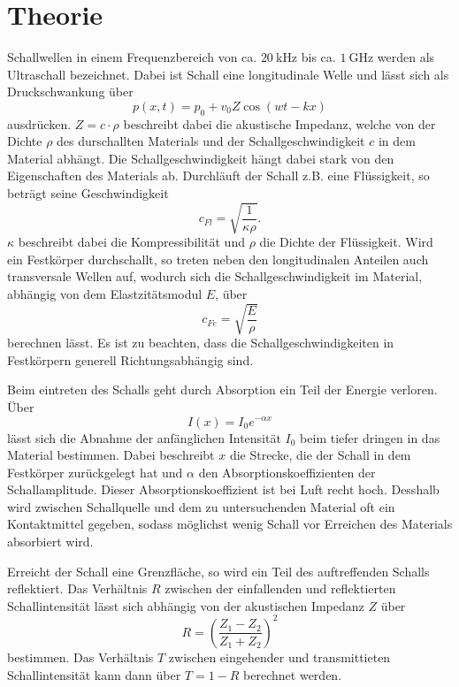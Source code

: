 \section{Theorie}
\label{sec:Theorie}
Schallwellen in einem Frequenzbereich von ca. $\SI{20}{\kilo\hertz}$ bis ca. $\SI{1}{\giga\hertz}$ werden als Ultraschall bezeichnet. Dabei ist Schall eine longitudinale Welle und lässt sich als Druckschwankung über
\begin{equation}
 p(x,t)=p_0+v_0Z\cos(wt-kx)
\end{equation}
ausdrücken. $Z=c\cdot \rho$ beschreibt dabei die akustische Impedanz, welche von der Dichte $\rho$ des durschallten Materials und der Schallgeschwindigkeit $c$ in dem Material abhängt.
Die Schallgeschwindigkeit hängt dabei stark von den Eigenschaften des Materials ab. Durchläuft der Schall z.B. eine Flüssigkeit, so beträgt seine Geschwindigkeit
\begin{equation}
    c_{Fl}=\sqrt{\frac{1}{\kappa \rho}} .
\end{equation}
$\kappa$ beschreibt dabei die Kompressibilität und $\rho$ die Dichte der Flüssigkeit.
Wird ein Festkörper durchschallt, so treten neben den longitudinalen Anteilen auch transversale Wellen auf, wodurch sich die Schallgeschwindigkeit im Material, abhängig von dem Elastzitätsmodul $E$, über
\begin{equation}
    c_{Fe}=\sqrt{\frac{E}{\rho}}
\end{equation}
berechnen lässt.
Es ist zu beachten, dass die Schallgeschwindigkeiten in Festkörpern generell Richtungsabhängig sind. 

Beim eintreten des Schalls geht durch Absorption ein Teil der Energie verloren. Über 
\begin{equation}
    I(x)=I_0e^{-\alpha x}
\end{equation}
lässt sich die Abnahme der anfänglichen Intensität $I_0$ beim tiefer dringen in das Material bestimmen. Dabei beschreibt $x$ die Strecke, die der Schall in dem Festkörper zurückgelegt hat und $\alpha$ den Absorptionskoeffizienten der Schallamplitude. Dieser Absorptionskoeffizient ist bei Luft recht hoch. Desshalb wird zwischen Schallquelle und dem zu untersuchenden Material oft ein Kontaktmittel gegeben, sodass möglichst wenig Schall vor Erreichen des Materials absorbiert wird. 

Erreicht der Schall eine Grenzfläche, so wird ein Teil des auftreffenden Schalls reflektiert. Das Verhältnis $R$ zwischen der einfallenden und reflektierten Schallintensität lässt sich abhängig von der akustischen Impedanz $Z$ über
\begin{equation}
    R=\left(\frac{Z_1-Z_2}{Z_1+Z_2}\right)^2
\end{equation}
bestimmen. Das Verhältnis $T$ zwischen eingehender und transmittieten Schallintensität kann dann über $T=1-R$ berechnet werden.

